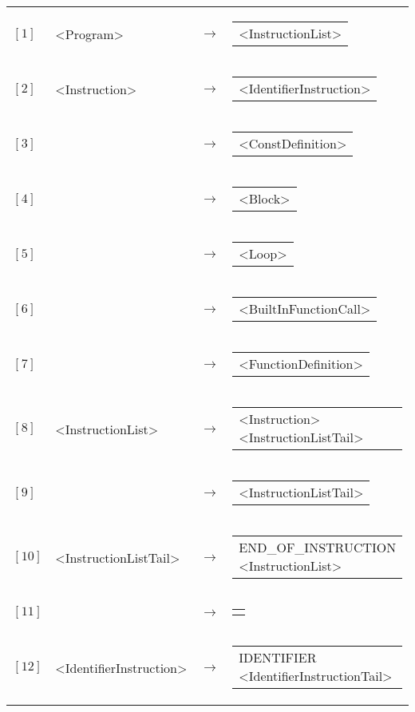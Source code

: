 \documentclass[a4paper,10pt]{article}
\begin{document}
\begin{longtable}{llll}
$[1]$&<Program>&$\rightarrow$&\begin{tabular}[t]{@{}l@{}}<InstructionList> \end{tabular}\\
$[2]$&<Instruction>&$\rightarrow$&\begin{tabular}[t]{@{}l@{}}<IdentifierInstruction> \end{tabular}\\
$[3]$&&$\rightarrow$&\begin{tabular}[t]{@{}l@{}}<ConstDefinition> \end{tabular}\\
$[4]$&&$\rightarrow$&\begin{tabular}[t]{@{}l@{}}<Block> \end{tabular}\\
$[5]$&&$\rightarrow$&\begin{tabular}[t]{@{}l@{}}<Loop> \end{tabular}\\
$[6]$&&$\rightarrow$&\begin{tabular}[t]{@{}l@{}}<BuiltInFunctionCall> \end{tabular}\\
$[7]$&&$\rightarrow$&\begin{tabular}[t]{@{}l@{}}<FunctionDefinition> \end{tabular}\\
$[8]$&<InstructionList>&$\rightarrow$&\begin{tabular}[t]{@{}l@{}}<Instruction> <InstructionListTail> \end{tabular}\\
$[9]$&&$\rightarrow$&\begin{tabular}[t]{@{}l@{}}<InstructionListTail> \end{tabular}\\
$[10]$&<InstructionListTail>&$\rightarrow$&\begin{tabular}[t]{@{}l@{}}END\_OF\_INSTRUCTION <InstructionList> \end{tabular}\\
$[11]$&&$\rightarrow$&\begin{tabular}[t]{@{}l@{}}$\epsilon$ \end{tabular}\\
$[12]$&<IdentifierInstruction>&$\rightarrow$&\begin{tabular}[t]{@{}l@{}}IDENTIFIER <IdentifierInstructionTail> \end{tabular}\\

\end{longtable}
\end{document}
